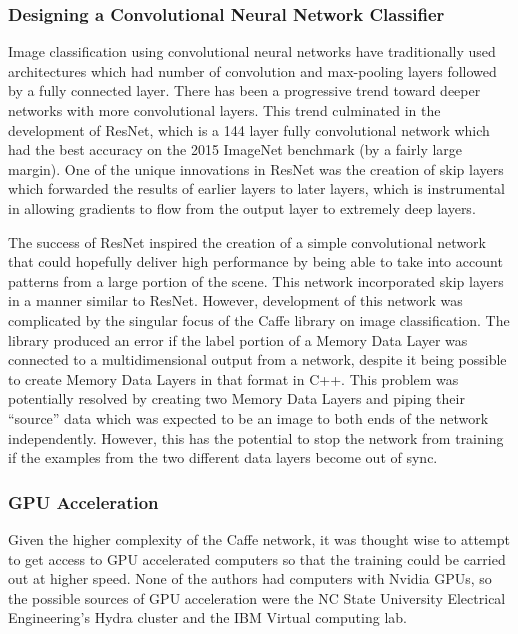 \documentclass[12pt]{article}
\begin{document}
\subsubsection{Designing a Convolutional Neural Network Classifier}

	Image classification using convolutional neural networks have traditionally used architectures which had number of convolution and max-pooling layers followed by a fully connected layer.  There has been a progressive trend toward deeper networks with more convolutional layers.  This trend culminated in the development of ResNet, which is a 144 layer fully convolutional network which had the best accuracy on the 2015 ImageNet benchmark (by a fairly large margin).  One of the unique innovations in ResNet was the creation of skip layers which forwarded the results of earlier layers to later layers, which is instrumental in allowing gradients to flow from the output layer to extremely deep layers. 

	The success of ResNet inspired the creation of a simple convolutional network that could hopefully deliver high performance by being able to take into account patterns from a large portion of the scene.  This network incorporated skip layers in a manner similar to ResNet.  However, development of this network was complicated by the singular focus of the Caffe library on image classification.  The library produced an error if the label portion of a Memory Data Layer was connected to a multidimensional output from a network, despite it being possible to create Memory Data Layers in that format in C++.  This problem was potentially resolved by creating two Memory Data Layers and piping their “source” data which was expected to be an image to both ends of the network independently.  However, this has the potential to stop the network from training if the examples from the two different data layers become out of sync.

\subsubsection{GPU Acceleration}

	Given the higher complexity of the Caffe network, it was thought wise to attempt to get access to GPU accelerated computers so that the training could be carried out at higher speed.  None of the authors had computers with Nvidia GPUs, so the possible sources of GPU acceleration were the NC State University Electrical Engineering's Hydra cluster and the IBM Virtual computing lab.
\end{document}
